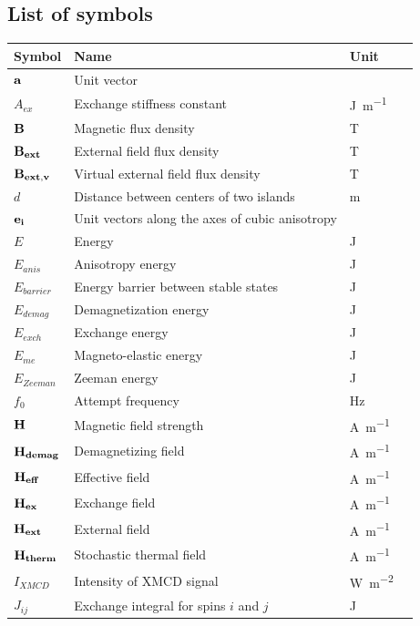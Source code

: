 \documentclass[11pt,a4paper,english]{article}
\begin{document}
\subsection*{List of symbols}
\begin{longtable}{llll}
\toprule
\bfseries Symbol & \bfseries Name &
\bfseries Unit \\\midrule\endhead
$\vb{a}$ & Unit vector & \\
$A_{ex}$ & Exchange stiffness constant & \si{\joule\per\metre} \\
$\vb{B}$ & Magnetic flux density & \si{\tesla} \\
$\vb{B_{ext}}$ & External field flux density & \si{\tesla} \\
$\vb{B_{ext,v}}$ & Virtual external field flux density & \si{\tesla} \\
$d$ & Distance between centers of two islands & \si{\metre} \\
$\vb{e_i}$ & Unit vectors along the axes of cubic anisotropy &  \\
$E$ & Energy & \si{\joule} \\
$E_{anis}$ & Anisotropy energy & \si{\joule} \\
$E_{barrier}$ & Energy barrier between stable states & \si{\joule} \\
$E_{demag}$ & Demagnetization energy & \si{\joule} \\
$E_{exch}$ & Exchange energy & \si{\joule} \\
$E_{me}$ & Magneto-elastic energy & \si{\joule} \\
$E_{Zeeman}$ & Zeeman energy & \si{\joule} \\
$f_0$ & Attempt frequency & \si{\hertz} \\
$\vb{H}$ & Magnetic field strength & \si{\ampere\per\metre} \\
$\vb{H_{demag}}$ & Demagnetizing field & \si{\ampere\per\metre} \\
$\vb{H_{eff}}$ & Effective field & \si{\ampere\per\metre} \\
$\vb{H_{ex}}$ & Exchange field & \si{\ampere\per\metre} \\
$\vb{H_{ext}}$ & External field & \si{\ampere\per\metre} \\
$\vb{H_{therm}}$ & Stochastic thermal field & \si{\ampere\per\metre} \\
$I_{XMCD}$ & Intensity of XMCD signal & \si{\watt\per\metre\squared} \\
$J_{ij}$ & Exchange integral for spins $i$ and $j$ & \si{\joule} \\

\end{longtable}
\end{document}
